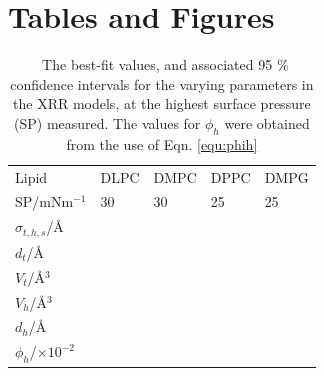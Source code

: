 \documentclass[amsmath,amssymb,superscriptaddress]{revtex4-1}
\begin{document}
\section{Tables and Figures}

%
\begin{table}
  \centering
	\caption{\ The best-fit values, and associated 95 \% confidence intervals for the varying parameters in the XRR models, at the highest surface pressure (SP) measured. The values for $\phi_h$ were obtained from the use of Eqn. \ref{equ:phih}}
	\label{tab:liptab1}
	\begin{tabular}{l|l|l|l|l}
		Lipid & DLPC & DMPC & DPPC & DMPG \\
    SP/mNm$^{-1}$ & 30 & 30 & 25 & 25 \\
		\hline
		$\sigma_{t,h,s}$/\AA &  &  &  &  \\
    $d_t$/\AA &  &  &  &  \\
    \hline
    $V_t$/\AA$^3$ &  &  &  &  \\
		$V_h$/\AA$^3$ &  &  &  &  \\
		$d_h$/\AA &  &  &  &  \\
    \hline
    $\phi_h$/$\times10^{-2}$ &  &  &  &  \\
	\end{tabular}
\end{table}
%
%
\end{document}
